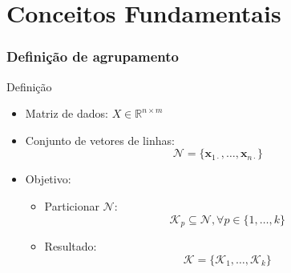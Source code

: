 \documentclass[10pt]{beamer}
\begin{document}




\section{Conceitos Fundamentais}


\begin{frame}
  \frametitle{Definição de agrupamento}

  \begin{block}{Definição}
    \begin{itemize}
      \item Matriz de dados: $X \in \mathbb{R}^{n \times m}$
      \item Conjunto de vetores de linhas:
        $$\mathcal{N} = \{ \mathbf{x}_{1 \cdot}, \dots, \mathbf{x}_{n \cdot} \}$$
      \item Objetivo:
        \begin{itemize}
          \item Particionar $\mathcal{N}$:
           $$\mathcal{K}_p \subseteq \mathcal{N}, \forall p \in \{ 1, \dots, k\}$$
          \item Resultado:
            $$\mathscr{K} = \{\mathcal{K}_1, \dots, \mathcal{K}_k\}$$
        \end{itemize}
    \end{itemize}
  \end{block}

\end{frame}
\end{document}

